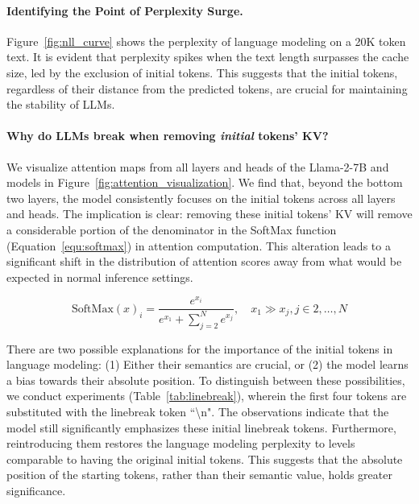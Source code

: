 \paragraph{Identifying the Point of Perplexity Surge.} 
Figure~\ref{fig:nll_curve} shows the perplexity of language modeling on a 20K token text. It is evident that perplexity spikes when the text length surpasses the cache size, led by the exclusion of initial tokens. This suggests that the initial tokens, regardless of their distance from the predicted tokens, are crucial for maintaining the stability of LLMs.

\paragraph{Why do LLMs break when removing \emph{initial} tokens' KV?} We visualize attention maps from all layers and heads of the Llama-2-7B and models in Figure~\ref{fig:attention_visualization}. We find that, beyond the bottom two layers, the model consistently focuses on the initial tokens across all layers and heads. The implication is clear: removing these initial tokens' KV will remove a considerable portion of the denominator in the SoftMax function (Equation~\ref{equ:softmax}) in attention computation. This alteration leads to a significant shift in the distribution of attention scores away from what would be expected in normal inference settings.

\begin{equation}
    \text{SoftMax}(x)_i = \frac{e^{x_i}}{e^{x_1} + \sum_{j=2}^{N} e^{x_j}}, \quad x_1 \gg x_j, j \in 2, \dots, N
    \label{equ:softmax}
\end{equation}

There are two possible explanations for the importance of the initial tokens in language modeling: (1) Either their semantics are crucial, or (2) the model learns a bias towards their absolute position. To distinguish between these possibilities, we conduct experiments (Table~\ref{tab:linebreak}), wherein the first four tokens are substituted with the linebreak token ``\textbackslash n". The observations indicate that the model still significantly emphasizes these initial linebreak tokens. Furthermore, reintroducing them restores the language modeling perplexity to levels comparable to having the original initial tokens. This suggests that the absolute position of the starting tokens, rather than their semantic value, holds greater significance.

